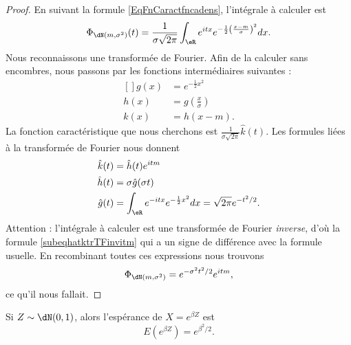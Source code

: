 \begin{proof}
	En suivant la formule \eqref{EqFnCaractfncadens}, l'intégrale à calculer est
	\begin{equation}
		\Phi_{\dN(m,\sigma^2)}(t)=\frac{1}{ \sigma\sqrt{2\pi} }\int_{\eR} e^{itx} e^{-\frac{ 1 }{2}\left( \frac{ x-m }{ \sigma } \right)^2}dx.
	\end{equation}
	Nous reconnaissons une transformée de Fourier. Afin de la calculer sans encombres, nous passons par les fonctions intermédiaires suivantes :
	\begin{equation}
		\begin{aligned}[]
			g(x) & = e^{-\frac{ 1 }{2}x^2}               \\
			h(x) & =g\left( \frac{ x }{ \sigma } \right) \\
			k(x) & =h(x-m).
		\end{aligned}
	\end{equation}
	La fonction caractéristique que nous cherchons est \( \frac{1}{ \sigma\sqrt{2\pi} }\hat k(t)\). Les formules liées à la transformée de Fourier nous donnent
	\begin{subequations}
		\begin{align}
			\hat k(t) & =\hat h(t) e^{itm}    \label{subeqhatktrTFinvitm}                    \\
			\hat h(t) & =\sigma\hat g(\sigma t)                                              \\
			\hat g(t) & =\int_{\eR} e^{-itx} e^{-\frac{ 1 }{2}x^2}dx=\sqrt{2\pi} e^{-t^2/2}.
		\end{align}
	\end{subequations}
	Attention : l'intégrale à calculer est une transformée de Fourier \emph{inverse}, d'où la formule \eqref{subeqhatktrTFinvitm} qui a un signe de différence avec la formule usuelle. En recombinant toutes ces expressions nous trouvons
	\begin{equation}
		\Phi_{\dN(m,\sigma^2)}= e^{-\sigma^2t^2/2} e^{itm},
	\end{equation}
	ce qu'il nous fallait.
\end{proof}

\begin{lemma}
	Si \( Z\sim\dN(0,1)\), alors l'espérance de \( X= e^{\beta Z}\) est
	\begin{equation}
		E(e^{\beta Z})= e^{\beta^2/2}.
	\end{equation}
\end{lemma}

